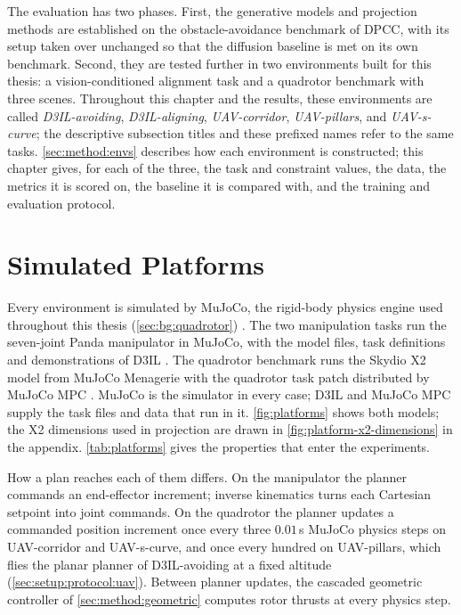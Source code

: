 The evaluation has two phases. First, the generative models and projection methods are established on
the obstacle-avoidance benchmark of \ac{DPCC}, with its setup taken over unchanged so that the diffusion
baseline is met on its own benchmark. Second, they are tested further in two environments built for
this thesis: a vision-conditioned alignment task and a quadrotor benchmark with three scenes.
Throughout this chapter and the results, these environments are called \emph{D3IL-avoiding},
\emph{D3IL-aligning}, \emph{UAV-corridor}, \emph{UAV-pillars}, and \emph{UAV-s-curve}; the descriptive
subsection titles and these prefixed names refer to the same tasks. \autoref{sec:method:envs} describes how each environment is constructed; this
chapter gives, for each of the three, the task and constraint values, the data, the metrics it is scored
on, the baseline it is compared with, and the training and evaluation protocol.

\section{Simulated Platforms}\label{sec:setup:platforms}

Every environment is simulated by MuJoCo, the rigid-body physics engine used throughout this thesis
(\autoref{sec:bg:quadrotor}) \parencite{todorov2012mujoco}. The two
manipulation tasks run the seven-joint Panda manipulator in MuJoCo, with the model files, task
definitions and demonstrations of D3IL \parencite{jia2024towards}. The quadrotor benchmark runs the Skydio X2 model from MuJoCo Menagerie
\parencite{zakka2022menagerie} with the quadrotor task patch distributed by MuJoCo MPC
\parencite{howell2022predictive}. MuJoCo is the simulator in every case; D3IL and MuJoCo MPC supply the
task files and data that run in it. \autoref{fig:platforms} shows both models; the X2 dimensions used
in projection are drawn in \autoref{fig:platform-x2-dimensions} in the appendix.
\autoref{tab:platforms} gives the properties that enter the experiments.

How a plan reaches each of them differs. On the manipulator the planner commands an end-effector
increment; inverse kinematics turns each Cartesian setpoint into joint commands. On the quadrotor the
planner updates a commanded position increment once every three $0.01$\,s MuJoCo physics steps on
UAV-corridor and UAV-s-curve, and once every hundred on UAV-pillars, which flies the planar planner of
D3IL-avoiding at a fixed altitude (\autoref{sec:setup:protocol:uav}).
Between planner updates, the cascaded geometric controller of \autoref{sec:method:geometric}
computes rotor thrusts at every physics step.

